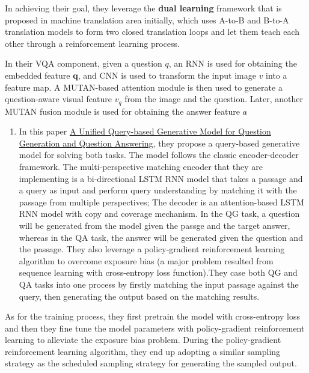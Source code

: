 \documentclass[]{book}
\providecommand{\tightlist}{%
  \setlength{\itemsep}{0pt}\setlength{\parskip}{0pt}}
\theoremstyle{definition}
\theoremstyle{definition}
\theoremstyle{definition}
\theoremstyle{remark}
\begin{document}
In achieving their goal, they leverage the \textbf{dual learning}
framework that is proposed in machine translation area initially, which
uses A-to-B and B-to-A translation models to form two closed translation
loops and let them teach each other through a reinforcement learning
process.

In their VQA component, given a question \(q\), an RNN is used for
obtaining the embedded feature \textbf{q}, and CNN is used to transform
the input image \(v\) into a feature map. A MUTAN-based attention module
is then used to generate a question-aware visual feature \(v_q\) from
the image and the question. Later, another MUTAN fusion module is used
for obtaining the answer feature \(a\hat{}\)

\begin{enumerate}
\def\labelenumi{\arabic{enumi}.}
\setcounter{enumi}{3}
\tightlist
\item
  In this paper \href{https://arxiv.org/pdf/1709.01058.pdf}{A Unified
  Query-based Generative Model for Question Generation and Question
  Answering}, they propose a query-based generative model for solving
  both tasks. The model follows the classic encoder-decoder framework.
  The multi-perspective matching encoder that they are implementing is a
  bi-directional LSTM RNN model that takes a passage and a query as
  input and perform query understanding by matching it with the passage
  from multiple perspectives; The decoder is an attention-based LSTM RNN
  model with copy and coverage mechanism. In the QG task, a question
  will be generated from the model given the passge and the target
  answer, whereas in the QA task, the answer will be generated given the
  question and the passage. They also leverage a policy-gradient
  reinforcement learning algorithm to overcome exposure bias (a major
  problem resulted from sequence learning with cross-entropy loss
  function).They case both QG and QA tasks into one process by firstly
  matching the input passage against the query, then generating the
  output based on the matching results.
\end{enumerate}

As for the training process, they first pretrain the model with
cross-entropy loss and then they fine tune the model parameters with
policy-gradient reinforcement learning to alleviate the exposure bias
problem. During the policy-gradient reinforcement learning algorithm,
they end up adopting a similar sampling strategy as the scheduled
sampling strategy for generating the sampled output.
\end{document}
